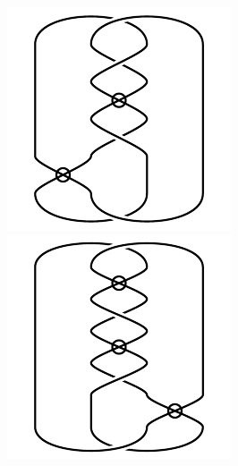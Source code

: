 \begin{figure}[H]
\begin{minipage}[b]{.18\linewidth}
\end{minipage}
\begin{minipage}[b]{.18\linewidth}
\centering
\includegraphics[width=\linewidth]{../data/virtual_4_44.png}
\end{minipage}
\begin{minipage}[b]{.18\linewidth}
\centering
\includegraphics[width=\linewidth]{../data/virtual_4_45.png}

\end{minipage}
\end{figure}
